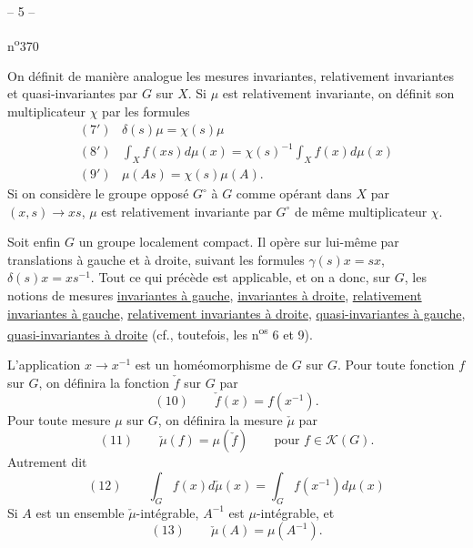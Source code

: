\begin{center}-- 5 --\end{center}\hfill n\textsuperscript{o}370

On définit de manière analogue les mesures invariantes, relativement invariantes et quasi-invariantes par $G$ sur $X$. Si $\mu$ est relativement invariante, on définit son multiplicateur $\chi$ par les formules
\[
\begin{array}{ll}
(7')&\delta(s)\mu=\chi(s)\mu\\
(8')&\displaystyle\int_X f(xs)d\mu(x)=\chi(s)^{-1}\int_X f(x)d\mu(x)\\
(9')&\mu(As)=\chi(s)\mu(A).
\end{array}
\]
Si on considère le groupe opposé $G^\circ$ à $G$ comme opérant dans $X$ par $(x,s)\longrightarrow xs$, $\mu$ est relativement invariante par $G^\circ$ de même multiplicateur $\chi$.

Soit enfin $G$ un groupe localement compact. Il opère sur lui-même par translations à gauche et à droite, suivant les formules $\gamma(s)x=sx$, $\delta(s)x=xs^{-1}$. Tout ce qui précède est applicable, et on a donc, sur $G$, les notions de mesures \uline{invariantes à gauche}, \uline{invariantes à droite}, \uline{relativement invariantes à gauche}, \uline{relativement invariantes à droite}, \uline{quasi-invariantes à gauche}, \uline{quasi-invariantes à droite} (cf., toutefois, les n\textsuperscript{os} 6 et 9).

L'application $x\longrightarrow x^{-1}$ est un homéomorphisme de $G$ sur $G$. Pour toute fonction $f$ sur $G$, on définira la fonction $\check f$ sur $G$ par
\[
(10)\qquad\check f(x)=f(x^{-1}).
\]
Pour toute mesure $\mu$ sur $G$, on définira la mesure $\check\mu$ par
\[
(11)\qquad\check\mu(f)=\mu(\check f)\qquad\text{pour }f\in\mathcal K(G).
\]
Autrement dit
\[
(12)\qquad\int_G f(x)d\check\mu(x)=\int_G f(x^{-1})d\mu(x)
\]
Si $A$ est un ensemble $\check\mu$-intégrable, $A^{-1}$ est $\mu$-intégrable, et
\[
(13)\qquad\check\mu(A)=\mu(A^{-1}).
\]
